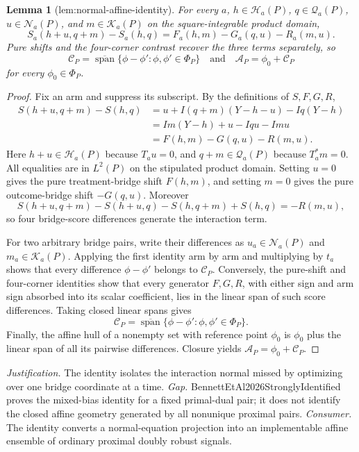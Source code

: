 \documentclass{article}
\newtheorem{lemma}{Lemma}
\begin{document}
\begin{lemma}[lem:normal-affine-identity]\label{lem:normal-affine-identity}
For every \(a\), \(h\in\mathcal H_a(P)\), \(q\in\mathcal Q_a(P)\), \(u\in\mathcal N_a(P)\), and \(m\in\mathcal K_a(P)\) on the square-integrable product domain, \[S_a(h+u,q+m)-S_a(h,q)=F_a(h,m)-G_a(q,u)-R_a(m,u).\] Pure shifts and the four-corner contrast recover the three terms separately, so \[\mathcal C_P=\overline{\operatorname{span}}\{\phi-\phi':\phi,\phi'\in\Phi_P\}\quad\text{and}\quad\mathcal A_P=\phi_0+\mathcal C_P\] for every \(\phi_0\in\Phi_P\).
\end{lemma}
\begin{proof}
Fix an arm and suppress its subscript.  By the definitions of \(S,F,G,R\),
\[
\begin{aligned}
S(h+u,q+m)-S(h,q)
&=u+I(q+m)(Y-h-u)-Iq(Y-h)\\
&=Im(Y-h)+u-Iqu-Imu\\
&=F(h,m)-G(q,u)-R(m,u).
\end{aligned}
\]
Here \(h+u\in\mathcal H_a(P)\) because \(T_au=0\), and \(q+m\in\mathcal Q_a(P)\) because \(T_a^*m=0\).  All equalities are in \(L^2(P)\) on the stipulated product domain.  Setting \(u=0\) gives the pure treatment-bridge shift \(F(h,m)\), and setting \(m=0\) gives the pure outcome-bridge shift \(-G(q,u)\).  Moreover
\[
S(h+u,q+m)-S(h+u,q)-S(h,q+m)+S(h,q)=-R(m,u),
\]
so four bridge-score differences generate the interaction term.

For two arbitrary bridge pairs, write their differences as \(u_a\in\mathcal N_a(P)\) and \(m_a\in\mathcal K_a(P)\).  Applying the first identity arm by arm and multiplying by \(t_a\) shows that every difference \(\phi-\phi'\) belongs to \(\mathcal C_P\).  Conversely, the pure-shift and four-corner identities show that every generator \(F,G,R\), with either sign and arm sign absorbed into its scalar coefficient, lies in the linear span of such score differences.  Taking closed linear spans gives
\[
\mathcal C_P=\overline{\operatorname{span}}\{\phi-\phi':\phi,\phi'\in\Phi_P\}.
\]
Finally, the affine hull of a nonempty set with reference point \(\phi_0\) is \(\phi_0\) plus the linear span of all its pairwise differences.  Closure yields \(\mathcal A_P=\phi_0+\mathcal C_P\).
\end{proof}
\par\smallskip\noindent \textit{Justification.} The identity isolates the interaction normal missed by optimizing over one bridge coordinate at a time. \textit{Gap.} BennettEtAl2026StronglyIdentified proves the mixed-bias identity for a fixed primal-dual pair; it does not identify the closed affine geometry generated by all nonunique proximal pairs. \textit{Consumer.} The identity converts a normal-equation projection into an implementable affine ensemble of ordinary proximal doubly robust signals.
\end{document}
